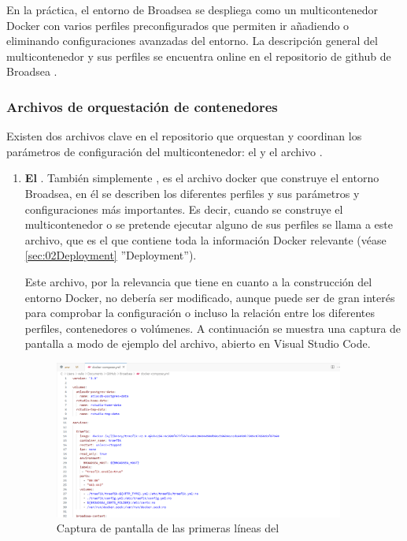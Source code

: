 En la práctica, el entorno de Broadsea se despliega como un multicontenedor Docker con varios perfiles preconfigurados que permiten ir añadiendo o eliminando configuraciones avanzadas del entorno. La descripción general del multicontenedor y sus perfiles se encuentra online en el repositorio de github de Broadsea \parencite{githubBroadsea}.  

\subsubsection{Archivos de orquestación de contenedores}

Existen dos archivos clave en el repositorio que orquestan y coordinan los parámetros de configuración del multicontenedor: el  y el archivo .

\begin{enumerate}

    \item \textbf{El }. También simplemente , es el archivo docker que construye el entorno Broadsea, en él se describen los diferentes perfiles y sus parámetros y configuraciones más importantes. Es decir, cuando se construye el multicontenedor o se pretende ejecutar alguno de sus perfiles se llama a este archivo, que es el que contiene toda la información Docker relevante (véase \ref{sec:02Deployment} ''Deployment'').

    Este archivo, por la relevancia que tiene en cuanto a la construcción del entorno Docker, no debería ser modificado, aunque puede ser de gran interés para comprobar la configuración o incluso la relación entre los diferentes perfiles, contenedores o volúmenes. A continuación se muestra una captura de pantalla a modo de ejemplo del archivo, abierto en Visual Studio Code.

\begin{figure}[H]
    \centering
    \includegraphics[width=0.90\textwidth]{figures/dockerCompose.png}
    \caption{Captura de pantalla de las primeras líneas del }
    \label{fig:dockerCompose}
\end{figure}


\end{enumerate}
